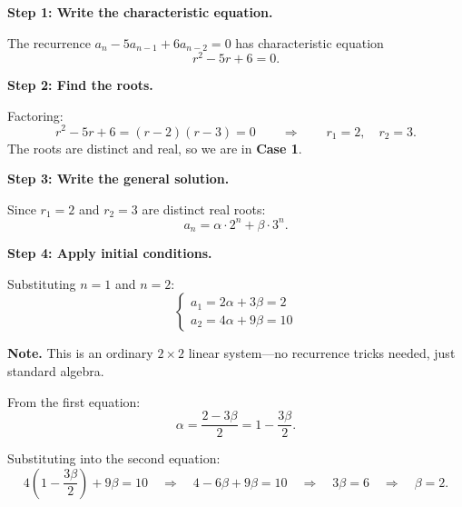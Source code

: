 \documentclass[12pt, a4paper]{article}
\begin{document}
\medskip
\textbf{Step 1: Write the characteristic equation.}

The recurrence $a_n - 5a_{n-1} + 6a_{n-2} = 0$ has characteristic equation
\[
  r^2 - 5r + 6 = 0.
\]

\textbf{Step 2: Find the roots.}

Factoring:
\[
  r^2 - 5r + 6 = (r - 2)(r - 3) = 0
  \qquad\Longrightarrow\qquad r_1 = 2, \quad r_2 = 3.
\]
The roots are distinct and real, so we are in \textbf{Case 1}.

\begin{center}
\end{center}

\textbf{Step 3: Write the general solution.}

Since $r_1 = 2$ and $r_2 = 3$ are distinct real roots:
\[
  a_n = \alpha \cdot 2^n + \beta \cdot 3^n.
\]

\textbf{Step 4: Apply initial conditions.}

Substituting $n = 1$ and $n = 2$:
\[
  \begin{cases}
    a_1 = 2\alpha + 3\beta = 2 \\[3pt]
    a_2 = 4\alpha + 9\beta = 10
  \end{cases}
\]

\textbf{Note.}\; This is an ordinary $2 \times 2$ linear system---no recurrence tricks needed, just standard algebra.

From the first equation:
\[
  \alpha = \frac{2 - 3\beta}{2} = 1 - \frac{3\beta}{2}.
\]

Substituting into the second equation:
\[
  4\!\left(1 - \frac{3\beta}{2}\right) + 9\beta = 10
  \quad\Longrightarrow\quad
  4 - 6\beta + 9\beta = 10
  \quad\Longrightarrow\quad
  3\beta = 6
  \quad\Longrightarrow\quad
  \beta = 2.
\]
\end{document}

